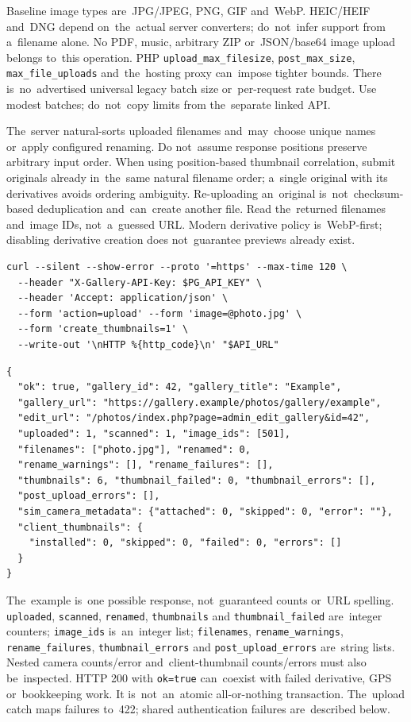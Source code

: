 \documentclass[11pt,a4paper]{article}
\newcommand{\codeword}[1]{\nolinkurl{#1}}
\begin{document}
Baseline image types are~JPG/JPEG, PNG, GIF and~WebP. HEIC/HEIF and~DNG depend on~the~actual
server converters; do~not~infer support from a~filename alone. No PDF, music, arbitrary ZIP
or~JSON/base64 image upload belongs to~this operation. PHP \codeword{upload_max_filesize},
\codeword{post_max_size}, \codeword{max_file_uploads} and~the~hosting proxy can~impose
tighter bounds. There is~no~advertised universal legacy batch size or~per-request rate
budget. Use modest batches; do~not~copy limits from the~separate linked API.

The~server natural-sorts uploaded filenames and~may~choose unique names or~apply configured
renaming. Do not~assume response positions preserve arbitrary input order. When using
position-based thumbnail correlation, submit originals already in~the~same natural filename
order; a~single original with its derivatives avoids ordering ambiguity. Re-uploading
an~original is~not~checksum-based deduplication and~can~create another file. Read
the~returned filenames and~image IDs, not~a~guessed URL. Modern derivative policy
is~WebP-first; disabling derivative creation does not~guarantee previews already exist.

\begin{lstlisting}[language={}]
curl --silent --show-error --proto '=https' --max-time 120 \
  --header "X-Gallery-API-Key: $PG_API_KEY" \
  --header 'Accept: application/json' \
  --form 'action=upload' --form 'image=@photo.jpg' \
  --form 'create_thumbnails=1' \
  --write-out '\nHTTP %{http_code}\n' "$API_URL"
\end{lstlisting}

\begin{lstlisting}[language={}]
{
  "ok": true, "gallery_id": 42, "gallery_title": "Example",
  "gallery_url": "https://gallery.example/photos/gallery/example",
  "edit_url": "/photos/index.php?page=admin_edit_gallery&id=42",
  "uploaded": 1, "scanned": 1, "image_ids": [501],
  "filenames": ["photo.jpg"], "renamed": 0,
  "rename_warnings": [], "rename_failures": [],
  "thumbnails": 6, "thumbnail_failed": 0, "thumbnail_errors": [],
  "post_upload_errors": [],
  "sim_camera_metadata": {"attached": 0, "skipped": 0, "error": ""},
  "client_thumbnails": {
    "installed": 0, "skipped": 0, "failed": 0, "errors": []
  }
}
\end{lstlisting}

The~example is~one possible response, not~guaranteed counts or~URL spelling.
\codeword{uploaded}, \codeword{scanned}, \codeword{renamed}, \codeword{thumbnails} and
\codeword{thumbnail_failed} are~integer counters; \codeword{image_ids} is~an~integer list;
\codeword{filenames}, \codeword{rename_warnings}, \codeword{rename_failures},
\codeword{thumbnail_errors} and \codeword{post_upload_errors} are~string lists. Nested
camera counts/error and~client-thumbnail counts/errors must also be~inspected. HTTP 200 with
\codeword{ok=true} can~coexist with failed derivative, GPS or~bookkeeping work. It
is~not~an~atomic all-or-nothing transaction. The~upload catch maps failures to~422; shared
authentication failures are~described below.
\end{document}
